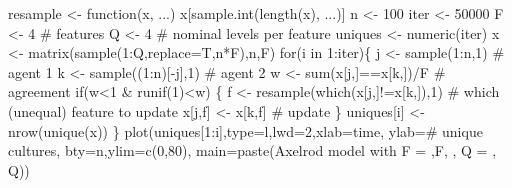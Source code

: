 \documentclass[
  a4paper,
  DIV=11,
  numbers=noendperiod,
  oneside]{scrreprt}
\newenvironment{Shaded}{}{}
\newcommand{\AttributeTok}[1]{\textcolor[rgb]{0.84,0.23,0.29}{#1}}
\newcommand{\CommentTok}[1]{\textcolor[rgb]{0.42,0.45,0.49}{#1}}
\newcommand{\ControlFlowTok}[1]{\textcolor[rgb]{0.84,0.23,0.29}{#1}}
\newcommand{\DecValTok}[1]{\textcolor[rgb]{0.00,0.36,0.77}{#1}}
\newcommand{\FunctionTok}[1]{\textcolor[rgb]{0.44,0.26,0.76}{#1}}
\newcommand{\NormalTok}[1]{\textcolor[rgb]{0.14,0.16,0.18}{#1}}
\newcommand{\OtherTok}[1]{\textcolor[rgb]{0.44,0.26,0.76}{#1}}
\newcommand{\SpecialCharTok}[1]{\textcolor[rgb]{0.00,0.36,0.77}{#1}}
\newcommand{\StringTok}[1]{\textcolor[rgb]{0.01,0.18,0.38}{#1}}
\begin{document}
\begin{Shaded}
\begin{Highlighting}[]
\NormalTok{resample }\OtherTok{\textless{}{-}} \ControlFlowTok{function}\NormalTok{(x, ...) x[}\FunctionTok{sample.int}\NormalTok{(}\FunctionTok{length}\NormalTok{(x), ...)]}
\NormalTok{n }\OtherTok{\textless{}{-}} \DecValTok{100}
\NormalTok{iter }\OtherTok{\textless{}{-}} \DecValTok{50000}
\NormalTok{F }\OtherTok{\textless{}{-}} \DecValTok{4} \CommentTok{\# features}
\NormalTok{Q }\OtherTok{\textless{}{-}} \DecValTok{4} \CommentTok{\# nominal levels per feature}
\NormalTok{uniques }\OtherTok{\textless{}{-}} \FunctionTok{numeric}\NormalTok{(iter)}
\NormalTok{x }\OtherTok{\textless{}{-}} \FunctionTok{matrix}\NormalTok{(}\FunctionTok{sample}\NormalTok{(}\DecValTok{1}\SpecialCharTok{:}\NormalTok{Q,}\AttributeTok{replace=}\NormalTok{T,n}\SpecialCharTok{*}\NormalTok{F),n,F)}
\ControlFlowTok{for}\NormalTok{(i }\ControlFlowTok{in} \DecValTok{1}\SpecialCharTok{:}\NormalTok{iter)\{}
\NormalTok{  j }\OtherTok{\textless{}{-}} \FunctionTok{sample}\NormalTok{(}\DecValTok{1}\SpecialCharTok{:}\NormalTok{n,}\DecValTok{1}\NormalTok{)       }\CommentTok{\# agent 1}
\NormalTok{  k }\OtherTok{\textless{}{-}} \FunctionTok{sample}\NormalTok{((}\DecValTok{1}\SpecialCharTok{:}\NormalTok{n)[}\SpecialCharTok{{-}}\NormalTok{j],}\DecValTok{1}\NormalTok{) }\CommentTok{\# agent 2}
\NormalTok{  w }\OtherTok{\textless{}{-}} \FunctionTok{sum}\NormalTok{(x[j,]}\SpecialCharTok{==}\NormalTok{x[k,])}\SpecialCharTok{/}\NormalTok{F }\CommentTok{\# agreement}
  \ControlFlowTok{if}\NormalTok{(w}\SpecialCharTok{\textless{}}\DecValTok{1} \SpecialCharTok{\&} \FunctionTok{runif}\NormalTok{(}\DecValTok{1}\NormalTok{)}\SpecialCharTok{\textless{}}\NormalTok{w) \{}
\NormalTok{    f }\OtherTok{\textless{}{-}} \FunctionTok{resample}\NormalTok{(}\FunctionTok{which}\NormalTok{(x[j,]}\SpecialCharTok{!=}\NormalTok{x[k,]),}\DecValTok{1}\NormalTok{) }
    \CommentTok{\# which (unequal) feature to update}
\NormalTok{    x[j,f] }\OtherTok{\textless{}{-}}\NormalTok{ x[k,f] }\CommentTok{\# update}
\NormalTok{    \}}
\NormalTok{  uniques[i] }\OtherTok{\textless{}{-}} \FunctionTok{nrow}\NormalTok{(}\FunctionTok{unique}\NormalTok{(x))}
\NormalTok{\}}
\FunctionTok{plot}\NormalTok{(uniques[}\DecValTok{1}\SpecialCharTok{:}\NormalTok{i],}\AttributeTok{type=}\StringTok{\textquotesingle{}l\textquotesingle{}}\NormalTok{,}\AttributeTok{lwd=}\DecValTok{2}\NormalTok{,}\AttributeTok{xlab=}\StringTok{\textquotesingle{}time\textquotesingle{}}\NormalTok{,}
     \AttributeTok{ylab=}\StringTok{\textquotesingle{}\# unique cultures\textquotesingle{}}\NormalTok{, }\AttributeTok{bty=}\StringTok{\textquotesingle{}n\textquotesingle{}}\NormalTok{,}\AttributeTok{ylim=}\FunctionTok{c}\NormalTok{(}\DecValTok{0}\NormalTok{,}\DecValTok{80}\NormalTok{),}
     \AttributeTok{main=}\FunctionTok{paste}\NormalTok{(}\StringTok{\textquotesingle{}Axelrod model with F = \textquotesingle{}}\NormalTok{,F, }\StringTok{\textquotesingle{}, Q = \textquotesingle{}}\NormalTok{, Q))}
\end{Highlighting}
\end{Shaded}
\end{document}

